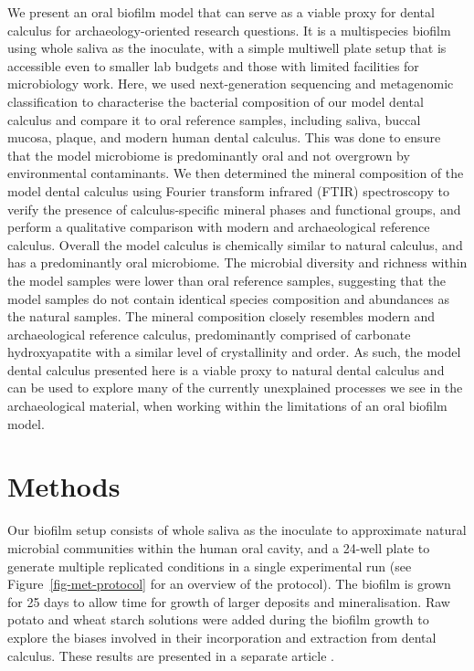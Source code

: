 \documentclass[10pt,a4paper]{article}
\begin{document}
We present an oral biofilm model that can serve as a viable proxy for
dental calculus for archaeology-oriented research questions. It is a
multispecies biofilm using whole saliva as the inoculate, with a simple
multiwell plate setup that is accessible even to smaller lab budgets and
those with limited facilities for microbiology work. Here, we used
next-generation sequencing and metagenomic classification to
characterise the bacterial composition of our model dental calculus and
compare it to oral reference samples, including saliva, buccal mucosa,
plaque, and modern human dental calculus. This was done to ensure that
the model microbiome is predominantly oral and not overgrown by
environmental contaminants. We then determined the mineral composition
of the model dental calculus using Fourier transform infrared (FTIR)
spectroscopy to verify the presence of calculus-specific mineral phases
and functional groups, and perform a qualitative comparison with modern
and archaeological reference calculus. Overall the model calculus is
chemically similar to natural calculus, and has a predominantly oral
microbiome. The microbial diversity and richness within the model
samples were lower than oral reference samples, suggesting that the
model samples do not contain identical species composition and
abundances as the natural samples. The mineral composition closely
resembles modern and archaeological reference calculus, predominantly
comprised of carbonate hydroxyapatite with a similar level of
crystallinity and order. As such, the model dental calculus presented
here is a viable proxy to natural dental calculus and can be used to
explore many of the currently unexplained processes we see in the
archaeological material, when working within the limitations of an oral
biofilm model.

\section{Methods}\label{methods}

Our biofilm setup consists of whole saliva as the inoculate to
approximate natural microbial communities within the human oral cavity,
and a 24-well plate to generate multiple replicated conditions in a
single experimental run (see Figure~\ref{fig-met-protocol} for an
overview of the protocol). The biofilm is grown for 25 days to allow
time for growth of larger deposits and mineralisation. Raw potato and
wheat starch solutions were added during the biofilm growth to explore
the biases involved in their incorporation and extraction from dental
calculus. These results are presented in a separate article
\citep{bartholdyInvestigatingBiases2022}.
\end{document}
